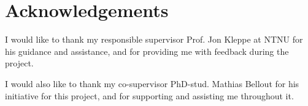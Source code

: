 
\section*{Acknowledgements} %
I would like to thank my responsible supervisor Prof. Jon Kleppe at NTNU for his guidance and assistance, and for providing me with feedback during the project.

I would also like to thank my co-supervisor PhD-stud. Mathias Bellout for his initiative for this project, and for supporting and assisting me throughout it.
